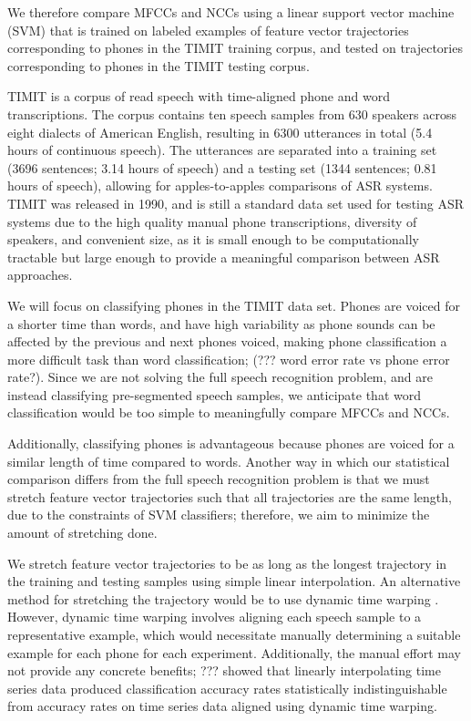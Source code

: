 We therefore compare MFCCs and NCCs
using a linear support vector machine (SVM)
that is trained on labeled
examples of feature vector trajectories
corresponding to phones
in the TIMIT training corpus,
and tested on trajectories
corresponding to phones
in the TIMIT testing corpus.

TIMIT \cite{garofolo1993} is a corpus of read speech
with time-aligned phone and word transcriptions.
The corpus contains ten speech samples
from 630 speakers across eight dialects
of American English,
resulting in 6300 utterances in total
(5.4 hours of continuous speech).
The utterances are separated into
a training set
(3696 sentences; 3.14 hours of speech)
and a testing set
(1344 sentences; 0.81 hours of speech),
allowing for apples-to-apples
comparisons of ASR systems.
TIMIT was released in 1990,
and is still a standard data set used
for testing ASR systems
due to the high quality
manual phone transcriptions,
diversity of speakers,
and convenient size,
as it is small enough to be
computationally tractable
but large enough to
provide a meaningful comparison
between ASR approaches.

We will focus on classifying
phones in the TIMIT data set.
Phones are voiced
for a shorter time than words,
and have high variability
as phone sounds can be affected
by the previous and next phones voiced,
making phone classification
a more difficult task than word classification;
(??? word error rate vs phone error rate?).
Since we are not solving the full
speech recognition problem,
and are instead classifying
pre-segmented speech samples,
we anticipate that word classification
would be too simple to meaningfully
compare MFCCs and NCCs.

Additionally, classifying phones
is advantageous because phones
are voiced for a similar length of time
compared to words.
Another way in which our statistical comparison
differs from the full speech recognition problem
is that we must stretch
feature vector trajectories
such that all trajectories are the same length,
due to the constraints of SVM classifiers;
therefore,
we aim to minimize the amount
of stretching done.

We stretch feature vector trajectories
to be as long as the longest trajectory
in the training and testing samples
using simple linear interpolation.
An alternative method
for stretching the trajectory
would be to use dynamic time warping
\cite{ratanamahatana2004}.
However, dynamic time warping
involves aligning each speech sample
to a representative example,
which would necessitate manually
determining a suitable example
for each phone for each experiment.
Additionally, the manual effort may not
provide any concrete benefits;
??? showed that linearly interpolating
time series data
produced classification accuracy rates
statistically indistinguishable
from accuracy rates on time series data
aligned using dynamic time warping.

